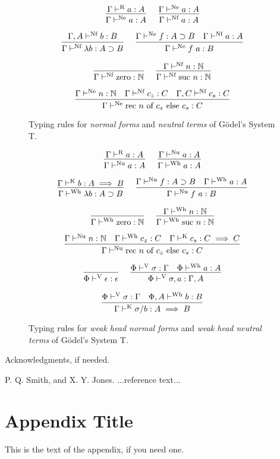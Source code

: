 \documentclass[preprint,authoryear]{sigplanconf}
\def\turnstyle{\vdash}
\def\asc{:}
\def\arr{\supset}
\def\nat{\mathbb{N}}
\def\emp{\epsilon}
\def\zero{\con{zero}}
\newcommand{\suc}[1]{\con{suc}~#1}
\newcommand{\rec}[3]{\con{rec}~#1~\con{of}~#2~\con{else}~#3}
\newcommand{\con}[1]{\textmd{#1}}
\newcommand{\turn}[1]{\turnstyle^\con{#1}}
\newcommand{\typr}[2]{\Gamma \turn{R}  #1 \asc #2}
\newcommand{\typnf}[2]{\ctypnf{\Gamma}{#1}{#2}}
\newcommand{\ctypnf}[3]{#1 \turn{Nf}  #2 \asc #3}
\newcommand{\typne}[2]{\Gamma \turn{Ne}  #1 \asc #2}
\newcommand{\typk}[3]{\Gamma \turn{K}  #1 \asc #2 \implies #3}
\newcommand{\typv}[2]{\Phi \turn{V}  #1 \asc #2}
\newcommand{\typwh}[2]{\ctypwh{\Gamma}{#1}{#2}}
\newcommand{\ctypwh}[3]{#1 \turn{Wh}  #2 \asc #3}
\newcommand{\typnu}[2]{\Gamma \turn{Nu}  #1 \asc #2}
\begin{document}
\begin{figure}[t!]
\caption{
Typing rules for \textit{normal forms} and \textit{neutral terms} of G{\"o}del's System T.
}
$$
\infer
  []
  {\typne{a}{A}}
{
  \typr{a}{A}
}
\quad
\infer
  []
  {\typnf{a}{A}}
{
  \typne{a}{A}
}
$$

$$
\infer
  []
  {\typnf{\lambda b}{A \arr B}}
{
  \ctypnf{\Gamma, A}{b}{B}
}
\quad
\infer
  []
  {\typne{f~a}{B}}
{
  \typne{f}{A \arr B}
  &
  \typnf{a}{A}
}
$$

$$
\infer
  []
  {\typnf{\zero}{\nat}}
{
}
\quad
\infer
  []
  {\typnf{\suc{n}}{\nat}}
{
  \typnf{n}{\nat}
}
$$

$$
\infer
  []
  {\typne{\rec{n}{c_z}{c_s}}{C}}
{
  \typne{n}{\nat}
  &
  \typnf{c_z}{C}
  &
  \ctypnf{\Gamma, C}{c_s}{C}
}
$$

\label{fig:type:nf}
\end{figure}

\begin{figure}[t!]
\caption{
Typing rules for \textit{weak head normal forms} and
\textit{weak head neutral terms} of G{\"o}del's System T.
}

$$
\infer
  []
  {\typnu{a}{A}}
{
  \typr{a}{A}
}
\quad
\infer
  []
  {\typwh{a}{A}}
{
  \typnu{a}{A}
}
$$

$$
\infer
  []
  {\typwh{\lambda b}{A \arr B}}
{
  \typk{b}{A}{B}
}
\quad
\infer
  []
  {\typnu{f~a}{B}}
{
  \typnu{f}{A \arr B}
  &
  \typwh{a}{A}
}
$$

$$
\infer
  []
  {\typwh{\zero}{\nat}}
{
}
\quad
\infer
  []
  {\typwh{\suc{n}}{\nat}}
{
  \typwh{n}{\nat}
}
$$

$$
\infer
  []
  {\typnu{\rec{n}{c_z}{c_s}}{C}}
{
  \typnu{n}{\nat}
  &
  \typwh{c_z}{C}
  &
  \typk{c_s}{C}{C}
}
$$

$$
\infer
  []
  {\typv{\emp}{\emp}}
{
}
\quad
\infer
  []
  {\typv{\sigma, a}{\Gamma, A}}
{
  \typv{\sigma}{\Gamma}
  &
  \ctypwh{\Phi}{a}{A}
}
$$

$$
\infer
  []
  {\typk{\sigma / b}{A}{B}}
{
  \typv{\sigma}{\Gamma}
  &
  \ctypwh{\Phi, A}{b}{B}
}
$$

\label{fig:type:wh}
\end{figure}

\acks

Acknowledgments, if needed.





\begin{thebibliography}{}
\softraggedright

P. Q. Smith, and X. Y. Jones. ...reference text...

\end{thebibliography}

\appendix
\section{Appendix Title}

This is the text of the appendix, if you need one.
\end{document}
